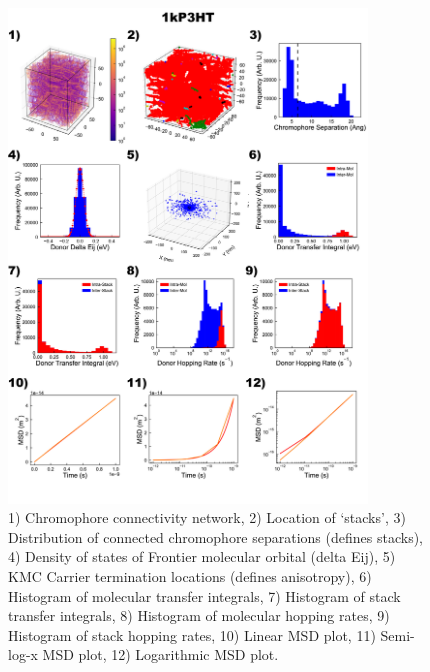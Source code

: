 \documentclass[12pt]{article}
\begin{document}
\begin{figure}[h]\centering
	\includegraphics[width=0.85\textwidth]{Figures/1kP3HT.png}
    \caption{   1) Chromophore connectivity network, 
                2) Location of `stacks', 
                3) Distribution of connected chromophore separations (defines stacks),
                4) Density of states of Frontier molecular orbital (delta Eij),
                5) KMC Carrier termination locations (defines anisotropy),
                6) Histogram of molecular transfer integrals,
                7) Histogram of stack transfer integrals,
                8) Histogram of molecular hopping rates,
                9) Histogram of stack hopping rates,
                10) Linear MSD plot,
                11) Semi-log-x MSD plot,
                12) Logarithmic MSD plot.}
	\label{fig:1kP3HT}
\end{figure}



\end{document}
